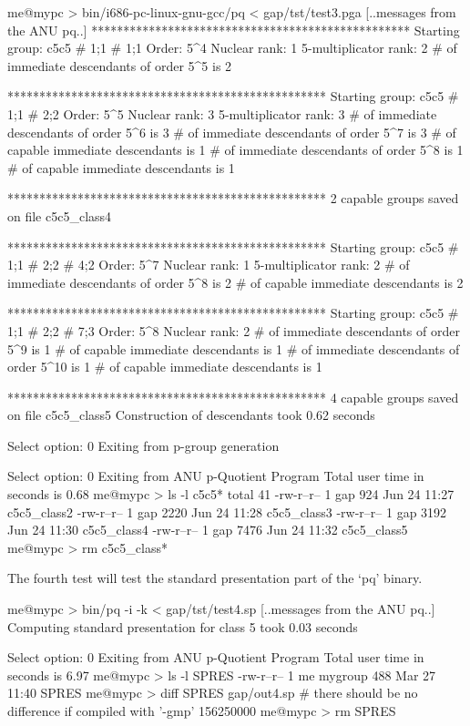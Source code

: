 \begintt
me@mypc > bin/i686-pc-linux-gnu-gcc/pq < gap/tst/test3.pga
[..messages from the ANU pq..]
**************************************************
Starting group: c5c5 # 1;1 # 1;1
Order: 5^4
Nuclear rank: 1
5-multiplicator rank: 2
# of immediate descendants of order 5^5 is 2

**************************************************
Starting group: c5c5 # 1;1 # 2;2
Order: 5^5
Nuclear rank: 3
5-multiplicator rank: 3
# of immediate descendants of order 5^6 is 3
# of immediate descendants of order 5^7 is 3
# of capable immediate descendants is 1
# of immediate descendants of order 5^8 is 1
# of capable immediate descendants is 1

**************************************************
2 capable groups saved on file c5c5_class4

**************************************************
Starting group: c5c5 # 1;1 # 2;2 # 4;2
Order: 5^7
Nuclear rank: 1
5-multiplicator rank: 2
# of immediate descendants of order 5^8 is 2
# of capable immediate descendants is 2

**************************************************
Starting group: c5c5 # 1;1 # 2;2 # 7;3
Order: 5^8
Nuclear rank: 2
# of immediate descendants of order 5^9 is 1
# of capable immediate descendants is 1
# of immediate descendants of order 5^10 is 1
# of capable immediate descendants is 1

**************************************************
4 capable groups saved on file c5c5_class5
Construction of descendants took 0.62 seconds

Select option: 0 
Exiting from p-group generation

Select option: 0 
Exiting from ANU p-Quotient Program
Total user time in seconds is 0.68
me@mypc > ls -l c5c5*
total 41
-rw-r--r--    1 gap     924 Jun 24 11:27 c5c5_class2
-rw-r--r--    1 gap    2220 Jun 24 11:28 c5c5_class3
-rw-r--r--    1 gap    3192 Jun 24 11:30 c5c5_class4
-rw-r--r--    1 gap    7476 Jun 24 11:32 c5c5_class5
me@mypc > rm c5c5_class*
\endtt

The fourth test will test the standard  presentation  part  of  the  `pq'
binary.

\begintt
me@mypc > bin/pq -i -k < gap/tst/test4.sp
[..messages from the ANU pq..]
Computing standard presentation for class 5 took 0.03 seconds

Select option: 0 
Exiting from ANU p-Quotient Program
Total user time in seconds is 6.97
me@mypc > ls -l SPRES
-rw-r--r--    1 me   mygroup        488 Mar 27 11:40 SPRES
me@mypc > diff SPRES gap/out4.sp
# there should be no difference if compiled with '-gmp'
156250000
me@mypc > rm SPRES
\endtt

